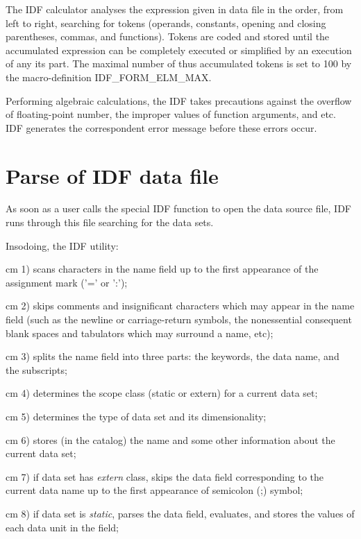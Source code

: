 The IDF calculator analyses the expression given in data file in the order,
from left to right, searching for tokens 
(operands, constants, opening and closing parentheses, commas, and functions).
Tokens are coded and stored until the accumulated expression can be
completely executed or simplified by an execution of any its part.
The maximal number of thus accumulated tokens is set to 100
by the macro-definition IDF\_FORM\_ELM\_MAX.

Performing algebraic calculations, the IDF takes precautions against
the overflow of floating-point number, 
the improper values of function arguments, and etc. 
IDF generates the correspondent 
error message before these errors occur.

\section{Parse of IDF data file}

As soon as a user calls the special IDF function to open
the data source file, IDF runs through this file
searching for the data sets.

\newpage

Insodoing, the IDF utility:

{
{ cm}
1) scans characters in the name field up to
the first appearance of the assignment mark ('=' or ':');
}

{
{ cm}
2) skips comments and insignificant characters
which may appear in the name field 
(such as the newline or carriage-return symbols, 
the nonessential consequent blank spaces and tabulators
which may surround a name, etc);
}

{
{ cm}
3) splits the name field into three parts:
the keywords, the data name, and the subscripts;
}

{
{ cm}
4) determines the scope class (static or extern)
for a current data set;
}

{
{ cm}
5) determines the type of data set and its
dimensionality;
}

{
{ cm}
6) stores (in the catalog) the name and some other information 
about the current data set;
}

{
{ cm}
7) if data set has {\it extern} class, 
skips the data field corresponding to the current data name
up to the first appearance of semicolon (;) symbol;
}

{
{ cm}
8) if data set is {\it static},
parses the data field, evaluates, and stores the values
of each data unit in the field;
}

